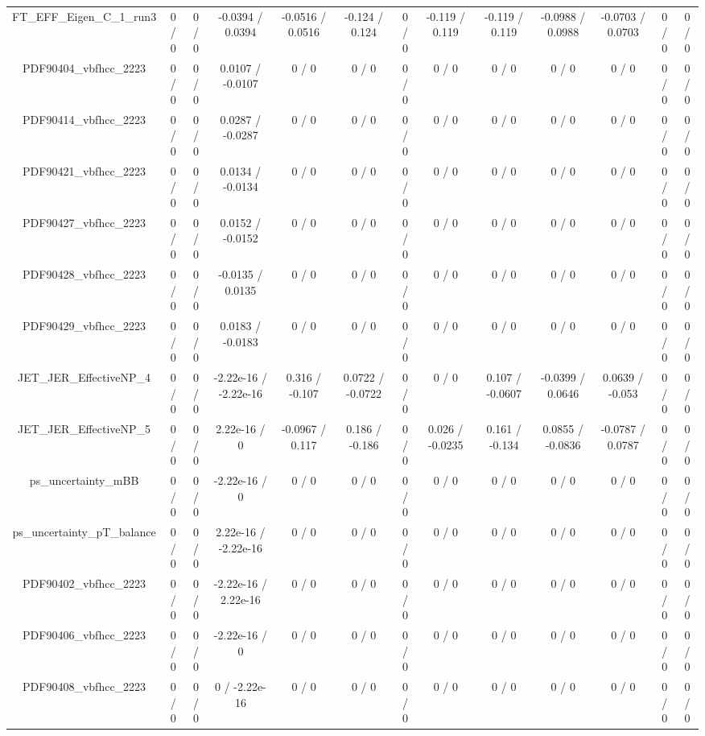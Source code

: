 \documentclass[10pt]{article}
\begin{document}
\begin{table}[htbp]
\begin{center}
\begin{tabular}{|c|c|c|c|c|c|c|c|c|c|c|c|c|}
  FT_EFF_Eigen_C_1_run3 & 0 / 0 & 0 / 0 & -0.0394 / 0.0394 & -0.0516 / 0.0516 & -0.124 / 0.124 & 0 / 0 & -0.119 / 0.119 & -0.119 / 0.119 & -0.0988 / 0.0988 & -0.0703 / 0.0703 & 0 / 0 & 0 / 0 \\ 
  PDF90404_vbfhcc_2223 & 0 / 0 & 0 / 0 & 0.0107 / -0.0107 & 0 / 0 & 0 / 0 & 0 / 0 & 0 / 0 & 0 / 0 & 0 / 0 & 0 / 0 & 0 / 0 & 0 / 0 \\ 
  PDF90414_vbfhcc_2223 & 0 / 0 & 0 / 0 & 0.0287 / -0.0287 & 0 / 0 & 0 / 0 & 0 / 0 & 0 / 0 & 0 / 0 & 0 / 0 & 0 / 0 & 0 / 0 & 0 / 0 \\ 
  PDF90421_vbfhcc_2223 & 0 / 0 & 0 / 0 & 0.0134 / -0.0134 & 0 / 0 & 0 / 0 & 0 / 0 & 0 / 0 & 0 / 0 & 0 / 0 & 0 / 0 & 0 / 0 & 0 / 0 \\ 
  PDF90427_vbfhcc_2223 & 0 / 0 & 0 / 0 & 0.0152 / -0.0152 & 0 / 0 & 0 / 0 & 0 / 0 & 0 / 0 & 0 / 0 & 0 / 0 & 0 / 0 & 0 / 0 & 0 / 0 \\ 
  PDF90428_vbfhcc_2223 & 0 / 0 & 0 / 0 & -0.0135 / 0.0135 & 0 / 0 & 0 / 0 & 0 / 0 & 0 / 0 & 0 / 0 & 0 / 0 & 0 / 0 & 0 / 0 & 0 / 0 \\ 
  PDF90429_vbfhcc_2223 & 0 / 0 & 0 / 0 & 0.0183 / -0.0183 & 0 / 0 & 0 / 0 & 0 / 0 & 0 / 0 & 0 / 0 & 0 / 0 & 0 / 0 & 0 / 0 & 0 / 0 \\ 
  JET_JER_EffectiveNP_4 & 0 / 0 & 0 / 0 & -2.22e-16 / -2.22e-16 & 0.316 / -0.107 & 0.0722 / -0.0722 & 0 / 0 & 0 / 0 & 0.107 / -0.0607 & -0.0399 / 0.0646 & 0.0639 / -0.053 & 0 / 0 & 0 / 0 \\ 
  JET_JER_EffectiveNP_5 & 0 / 0 & 0 / 0 & 2.22e-16 / 0 & -0.0967 / 0.117 & 0.186 / -0.186 & 0 / 0 & 0.026 / -0.0235 & 0.161 / -0.134 & 0.0855 / -0.0836 & -0.0787 / 0.0787 & 0 / 0 & 0 / 0 \\ 
  ps_uncertainty_mBB & 0 / 0 & 0 / 0 & -2.22e-16 / 0 & 0 / 0 & 0 / 0 & 0 / 0 & 0 / 0 & 0 / 0 & 0 / 0 & 0 / 0 & 0 / 0 & 0 / 0 \\ 
  ps_uncertainty_pT_balance & 0 / 0 & 0 / 0 & 2.22e-16 / -2.22e-16 & 0 / 0 & 0 / 0 & 0 / 0 & 0 / 0 & 0 / 0 & 0 / 0 & 0 / 0 & 0 / 0 & 0 / 0 \\ 
  PDF90402_vbfhcc_2223 & 0 / 0 & 0 / 0 & -2.22e-16 / 2.22e-16 & 0 / 0 & 0 / 0 & 0 / 0 & 0 / 0 & 0 / 0 & 0 / 0 & 0 / 0 & 0 / 0 & 0 / 0 \\ 
  PDF90406_vbfhcc_2223 & 0 / 0 & 0 / 0 & -2.22e-16 / 0 & 0 / 0 & 0 / 0 & 0 / 0 & 0 / 0 & 0 / 0 & 0 / 0 & 0 / 0 & 0 / 0 & 0 / 0 \\ 
  PDF90408_vbfhcc_2223 & 0 / 0 & 0 / 0 & 0 / -2.22e-16 & 0 / 0 & 0 / 0 & 0 / 0 & 0 / 0 & 0 / 0 & 0 / 0 & 0 / 0 & 0 / 0 & 0 / 0 \\ 

\end{tabular}
\end{center}
\end{table}
\end{document}
